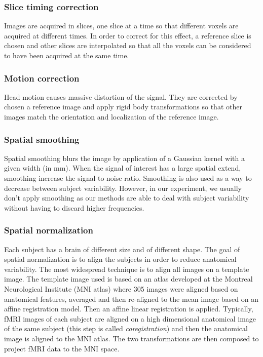 \subsubsection{Slice timing correction}
Images are acquired in slices, one slice at a time so that different voxels are acquired at different times.
In order to correct for this effect, a reference slice is chosen and other slices are interpolated so that all the voxels can be considered to have been acquired at the same time. 

\subsubsection{Motion correction}
Head motion causes massive distortion of the signal. They are corrected by chosen a reference image and apply rigid body transformations so that other images match the orientation and localization of the reference image.

\subsubsection{Spatial smoothing}
Spatial smoothing blurs the image by application of a Gaussian kernel with a given width (in mm). When the signal of interest has a large spatial extend, smoothing increase the signal to noise ratio. 
Smoothing is also used as a way to decrease between subject variability.
However, in our experiment, we usually don't apply smoothing as our methods are able to deal with subject variability without having to discard higher frequencies.

\subsubsection{Spatial normalization}
Each subject has a brain of different size and of different shape.
The goal of spatial normalization is to align the subjects in order to reduce anatomical variability.
The most widespread technique is to align all images on a template image. The
template image used is based on an atlas developed at the Montreal Neurological
Institute (MNI atlas) where 305 images were aligned based on anatomical features, averaged and then re-aligned to the mean image based on an affine registration model.
Then an affine linear registration is applied. Typically, fMRI images of each subject are aligned on a high dimensional anatomical image of the same subject (this step is called \emph{coregistration}) and then the anatomical image is aligned to the MNI atlas. The two transformations are then composed to project fMRI data to the MNI space.

